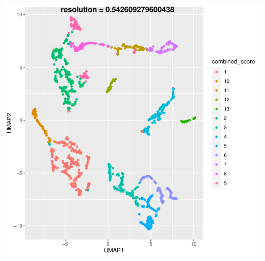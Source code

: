 \documentclass{beamer}
\begin{document}
{\begin{columns}
\begin{column}{0.50\textwidth}
			\includegraphics[width=\textwidth]{umap_combined.pdf}
		\end{column}
	\end{columns}
}
\end{document}
